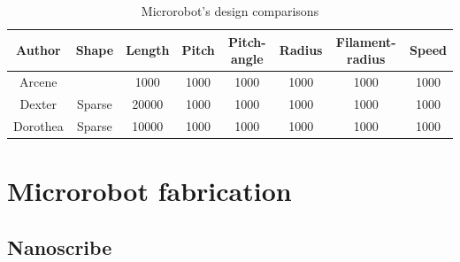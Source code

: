 \documentclass[12pt,a4paper,titlepage]{report}
\newcommand{\head}[1]{\textnormal{\textbf{#1}}}
\begin{document}

















\begin{table}[!ht]

\centering%
{
\begin{tabular}{c c c c c c c c}%
\toprule[2.0pt]



\head{Author} & \head{Shape} & \head{Length} & \head{Pitch} & \head{Pitch-angle} & \head{Radius} & \head{Filament-radius} & \head{Speed}\\

\midrule
Arcene 	& 	    		  & 	1000		& 	1000		& 	1000		& 	1000		& 	1000		& 	1000\\%
Dexter 	& 	Sparse 		  & 	20000	& 	1000		& 	1000		& 	1000		& 	1000		& 	1000\\
Dorothea & 	Sparse 		  & 	10000	& 	1000		& 	1000		& 	1000		& 	1000		& 	1000\\[1ex]%



\bottomrule[2.0pt]
\end{tabular}
}
\label{table:nonlin}%
\caption{Microrobot\rq{}s design comparisons}\label{design}%
\end{table}










\section{Microrobot fabrication} \label{microFabric}
\subsection{Nanoscribe}
\end{document}
